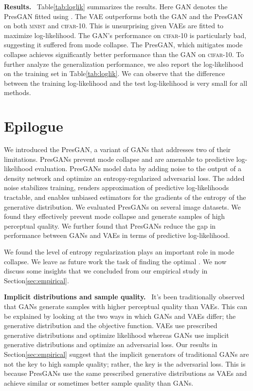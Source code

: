\documentclass[11pt]{article}
\DeclareRobustCommand{\parhead}[1]{\textbf{#1}~}
\begin{document}
\parhead{Results.}
Table\nobreakspace \ref {tab:loglik} summarizes the results. Here \gls{GAN} denotes the Pres\gls{GAN} fitted using . The \gls{VAE} outperforms both the \gls{GAN} and the Pres\gls{GAN} on both \textsc{mnist} and \textsc{cifar}-10. This is unsurprising given \glspl{VAE} are fitted to maximize log-likelihood. The \gls{GAN}'s performance on \textsc{cifar}-10 is particularly bad, suggesting it suffered from mode collapse. The Pres\gls{GAN}, which mitigates mode collapse achieves significantly better performance than the \gls{GAN} on \textsc{cifar}-10. To further analyze the generalization performance, we also report the log-likelihood on the training set in Table\nobreakspace \ref {tab:loglik}. We can observe that the difference between the training log-likelihood and the test log-likelihood is very small for all methods.
 
\section{Epilogue}
\label{sec:discussion}

We introduced the Pres\gls{GAN}, a variant of \glspl{GAN} that addresses two of their limitations. Pres\glspl{GAN} prevent mode collapse and are amenable to predictive log-likelihood evaluation. Pres\glspl{GAN} model data by adding noise to the output of a density network and optimize an entropy-regularized adversarial loss. The added noise stabilizes training, renders approximation of predictive log-likelihoods tractable, and enables unbiased estimators for the gradients of the entropy of the generative distribution. We evaluated Pres\glspl{GAN} on several image datasets. We found they effectively prevent mode collapse and generate samples of high perceptual quality. We further found that Pres\glspl{GAN} reduce the gap in performance between \glspl{GAN} and \glspl{VAE} in terms of predictive log-likelihood.

We found the level of entropy regularization  plays an important role in mode collapse. We leave as future work the task of finding the optimal . 
We now discuss some insights that we concluded from our empirical study in Section\nobreakspace \ref {sec:empirical}.

\parhead{Implicit distributions and sample quality.} It's been traditionally observed that \glspl{GAN} generate samples with higher perceptual quality than \glspl{VAE}. This can be explained by looking at the two ways in which \glspl{GAN} and \glspl{VAE} differ; the generative distribution and the objective function. \glspl{VAE} use prescribed generative distributions and optimize likelihood whereas \glspl{GAN} use implicit generative distributions and optimize an adversarial loss. Our results in Section\nobreakspace \ref {sec:empirical} suggest that the implicit generators of traditional \glspl{GAN} are not the key to high sample quality; rather, the key is the adversarial loss. This is because Pres\glspl{GAN} use the same prescribed generative distributions as \glspl{VAE} and achieve similar or sometimes better sample quality than \glspl{GAN}. 
\end{document}
